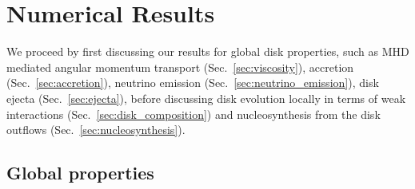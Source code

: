 \section{Numerical Results}
\label{sec:results}

We proceed by first discussing our results for global disk properties, such as MHD mediated angular momentum transport (Sec.~\ref{sec:viscosity}), accretion (Sec.~\ref{sec:accretion}), neutrino emission (Sec.~\ref{sec:neutrino_emission}), disk ejecta (Sec.~\ref{sec:ejecta}), before discussing disk evolution locally in terms of weak interactions (Sec.~\ref{sec:disk_composition}) and nucleosynthesis from the disk outflows (Sec.~\ref{sec:nucleosynthesis}).


\subsection{Global properties}
\label{sec:global_properties}

